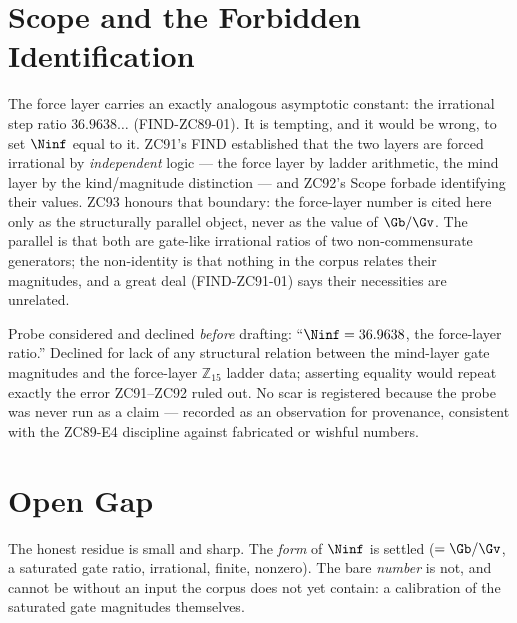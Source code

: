 \documentclass[12pt, a4paper]{article}
\begin{document}
\section{Scope and the Forbidden Identification}
\label{sec:scope-zc93}

The force layer carries an exactly analogous asymptotic constant: the
irrational step ratio $36.9638\ldots$ (FIND-ZC89-01). It is tempting, and it
would be wrong, to set $\Ninf$ equal to it. ZC91's FIND established that the
two layers are forced irrational by \emph{independent} logic --- the force
layer by ladder arithmetic, the mind layer by the kind/magnitude distinction
--- and ZC92's Scope forbade identifying their values. ZC93 honours that
boundary: the force-layer number is cited here only as the structurally
parallel object, never as the value of $\Gb/\Gv$. The parallel is that both
are gate-like irrational ratios of two non-commensurate generators; the
non-identity is that nothing in the corpus relates their magnitudes, and a
great deal (FIND-ZC91-01) says their necessities are unrelated.

\begin{openqbox}[title={OBS-ZC93-01: The cross-layer-equality temptation,
  pre-empted}]
Probe considered and declined \emph{before} drafting: ``$\Ninf=36.9638$, the
force-layer ratio.'' Declined for lack of any structural relation between the
mind-layer gate magnitudes and the force-layer $\mathbb{Z}_{15}$ ladder data;
asserting equality would repeat exactly the error ZC91--ZC92 ruled out. No
scar is registered because the probe was never run as a claim --- recorded as
an observation for provenance, consistent with the ZC89-E4 discipline against
fabricated or wishful numbers.
\end{openqbox}

\section{Open Gap}
\label{sec:gap-zc93}

The honest residue is small and sharp. The \emph{form} of $\Ninf$ is settled
($=\Gb/\Gv$, a saturated gate ratio, irrational, finite, nonzero). The bare
\emph{number} is not, and cannot be without an input the corpus does not yet
contain: a calibration of the saturated gate magnitudes themselves.
\end{document}
